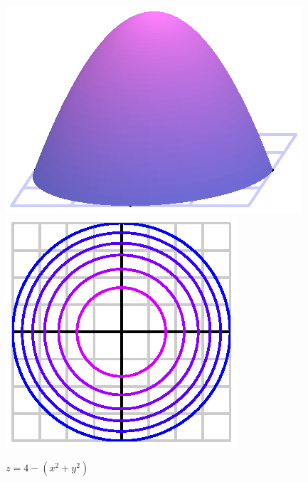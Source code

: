 \begin{figure}[ht]
  \begin{center}
    \includegraphics{figures/zis4r2.eps}
    \hspace*{30pt}
    \includegraphics{figures/zis4r2_contours.eps}
  \end{center}
  \caption{$z=4-(x^2+y^2)$}
\end{figure}
